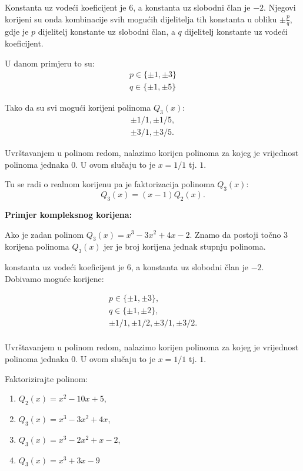 Konstanta uz vodeći koeficijent je $6$, a konstanta uz slobodni član je $-2$.
Njegovi korijeni su onda kombinacije svih mogućih dijelitelja tih konstanta u
obliku $\pm\frac{p}{q}$, gdje je $p$ dijelitelj konstante uz slobodni član, a
$q$ dijelitelj konstante uz vodeći koeficijent.

U danom primjeru to su:
\begin{gather*}
p\in\{\pm1, \pm3\}\\
q\in\{\pm1, \pm5\}
\end{gather*}

Tako da su svi mogući korijeni polinoma $Q_3(x)$:
\begin{gather*}
\pm 1/1, \pm 1/5,\\
\pm 3/1, \pm 3/5.
\end{gather*}

Uvrštavanjem u polinom redom, nalazimo korijen polinoma za kojeg je vrijednost
polinoma jednaka $0$. U ovom slučaju to je $x=1/1$ tj. $1$.

Tu se radi o realnom korijenu pa je faktorizacija polinoma $Q_3(x)$:
$$
Q_3(x) = (x-1)Q_2(x).
$$

\textbf{Primjer kompleksnog korijena:}

Ako je zadan polinom $Q_3(x) = x^3-3x^2+4x-2$. Znamo da postoji točno $3$
korijena polinoma $Q_3(x)$ jer je broj korijena jednak stupnju polinoma.


konstanta uz vodeći koeficijent je 6,
a konstanta uz slobodni član je $-2$. Dobivamo moguće korijene:

\begin{gather*}
p\in\{\pm1, \pm3\},\\
q\in\{\pm1, \pm2\},\\
\pm 1/1, \pm 1/2, \pm 3/1, \pm 3/2.\\
\end{gather*}

Uvrštavanjem u polinom redom, nalazimo korijen polinoma za kojeg je vrijednost
polinoma jednaka $0$. U ovom slučaju to je $x=1/1$ tj. $1$.


\begin{example}
    Faktorizirajte polinom:
    \begin{enumerate}
        \item $Q_2(x) = x^2-10x+5$,
        \item $Q_3(x) = x^3-3x^2+4x$,
        \item $Q_3(x) = x^3-2x^2+x-2$,
        \item $Q_3(x) = x^3+3x-9$
    \end{enumerate}
\end{example}


